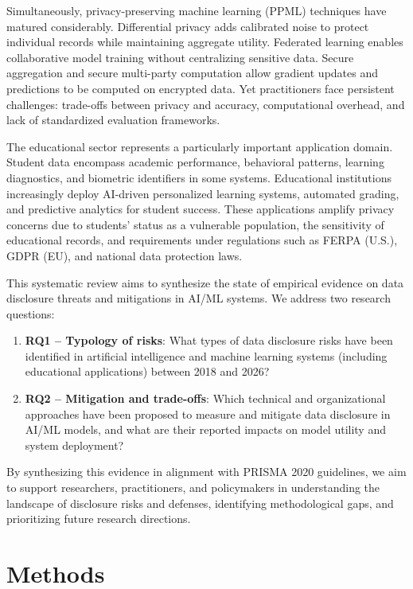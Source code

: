 \documentclass[11pt,a4paper]{article}
\begin{document}
Simultaneously, privacy-preserving machine learning (PPML) techniques have matured considerably. Differential privacy adds calibrated noise to protect individual records while maintaining aggregate utility. Federated learning enables collaborative model training without centralizing sensitive data. Secure aggregation and secure multi-party computation allow gradient updates and predictions to be computed on encrypted data. Yet practitioners face persistent challenges: trade-offs between privacy and accuracy, computational overhead, and lack of standardized evaluation frameworks.

The educational sector represents a particularly important application domain. Student data encompass academic performance, behavioral patterns, learning diagnostics, and biometric identifiers in some systems. Educational institutions increasingly deploy AI-driven personalized learning systems, automated grading, and predictive analytics for student success. These applications amplify privacy concerns due to students' status as a vulnerable population, the sensitivity of educational records, and requirements under regulations such as FERPA (U.S.), GDPR (EU), and national data protection laws.

This systematic review aims to synthesize the state of empirical evidence on data disclosure threats and mitigations in AI/ML systems. We address two research questions:

\begin{enumerate}
\item \textbf{RQ1 -- Typology of risks}: What types of data disclosure risks have been identified in artificial intelligence and machine learning systems (including educational applications) between 2018 and 2026?
\item \textbf{RQ2 -- Mitigation and trade-offs}: Which technical and organizational approaches have been proposed to measure and mitigate data disclosure in AI/ML models, and what are their reported impacts on model utility and system deployment?
\end{enumerate}

By synthesizing this evidence in alignment with PRISMA 2020 guidelines, we aim to support researchers, practitioners, and policymakers in understanding the landscape of disclosure risks and defenses, identifying methodological gaps, and prioritizing future research directions.

\section{Methods}
\end{document}
